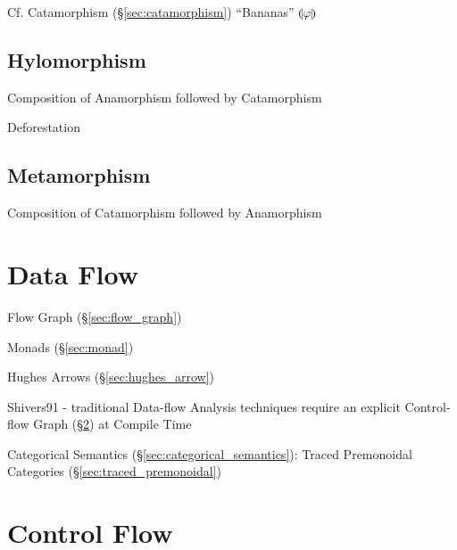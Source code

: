 \fist Cf. Catamorphism (\S\ref{sec:catamorphism}) ``Bananas''
$\llparenthesis \varphi \rrparenthesis$



\subsection{Hylomorphism}\label{sec:hylomorphism}

Composition of Anamorphism followed by Catamorphism

Deforestation



\subsection{Metamorphism}\label{sec:metamorphism}

Composition of Catamorphism followed by Anamorphism



\section{Data Flow}\label{sec:data_flow}

\fist Flow Graph (\S\ref{sec:flow_graph})

Monads (\S\ref{sec:monad})

Hughes Arrows (\S\ref{sec:hughes_arrow})

Shivers91 - traditional Data-flow Analysis techniques require an
explicit Control-flow Graph (\S\ref{sec:control_flow}) at Compile Time

Categorical Semantics (\S\ref{sec:categorical_semantics}): Traced
Premonoidal Categories (\S\ref{sec:traced_premonoidal})



\section{Control Flow}\label{sec:control_flow}

